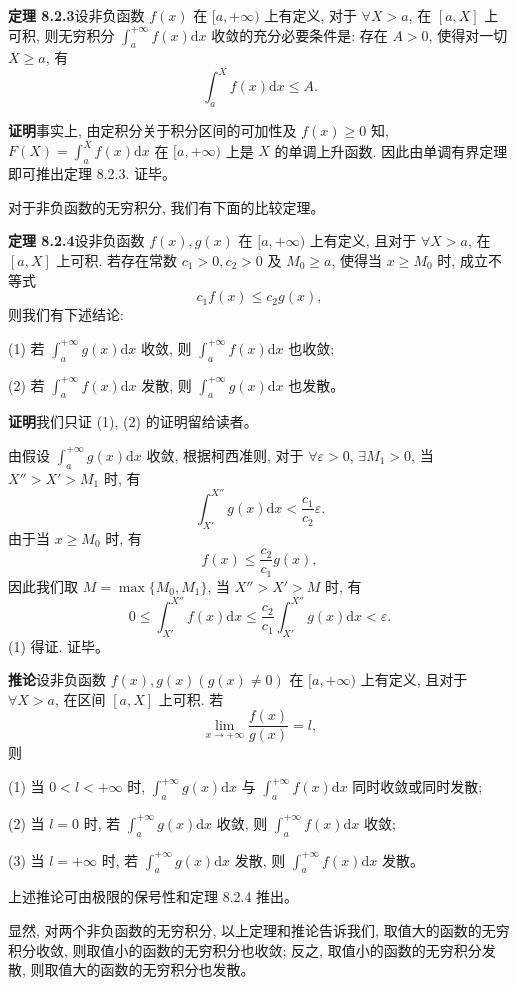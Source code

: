 \documentclass[UTF8, 12pt, fontset=fandol, oneside]{ctexart}
\begin{document}
\noindent\textbf{定理 8.2.3}\quad 设非负函数 $f(x)$ 在 $[a,+\infty)$ 上有定义, 对于 $\forall X>a$, 在 $[a,X]$ 上可积, 则无穷积分 $\int_a^{+\infty}f(x)\mathrm dx$ 收敛的充分必要条件是: 存在 $A>0$, 使得对一切 $X\geq a$, 有
\[
  \int_a^X f(x)\mathrm dx\leq A.
\]

\noindent\textbf{证明}\quad 事实上, 由定积分关于积分区间的可加性及 $f(x)\geq0$ 知, $F(X)=\int_a^X f(x)\mathrm dx$ 在 $[a,+\infty)$ 上是 $X$ 的单调上升函数. 因此由单调有界定理即可推出定理 8.2.3. 证毕。

对于非负函数的无穷积分, 我们有下面的比较定理。

\noindent\textbf{定理 8.2.4}\quad 设非负函数 $f(x),g(x)$ 在 $[a,+\infty)$ 上有定义, 且对于 $\forall X>a$, 在 $[a,X]$ 上可积. 若存在常数 $c_1>0,c_2>0$ 及 $M_0\geq a$, 使得当 $x\geq M_0$ 时, 成立不等式
\[
  c_1f(x)\leq c_2g(x),
\]
则我们有下述结论:

(1) 若 $\int_a^{+\infty}g(x)\mathrm dx$ 收敛, 则 $\int_a^{+\infty}f(x)\mathrm dx$ 也收敛;

(2) 若 $\int_a^{+\infty}f(x)\mathrm dx$ 发散, 则 $\int_a^{+\infty}g(x)\mathrm dx$ 也发散。

\noindent\textbf{证明}\quad 我们只证 (1), (2) 的证明留给读者。

由假设 $\int_a^{+\infty}g(x)\mathrm dx$ 收敛, 根据柯西准则, 对于 $\forall\varepsilon>0$, $\exists M_1>0$, 当 $X''>X'>M_1$ 时, 有
\[
  \int_{X'}^{X''}g(x)\mathrm dx<\frac{c_1}{c_2}\varepsilon.
\]
由于当 $x\geq M_0$ 时, 有
\[
  f(x)\leq \frac{c_2}{c_1}g(x),
\]
因此我们取 $M=\max\{M_0,M_1\}$, 当 $X''>X'>M$ 时, 有
\[
  0\leq \int_{X'}^{X''}f(x)\mathrm dx
  \leq
  \frac{c_2}{c_1}\int_{X'}^{X''}g(x)\mathrm dx<\varepsilon.
\]
(1) 得证. 证毕。

\noindent\textbf{推论}\quad 设非负函数 $f(x),g(x)(g(x)\ne0)$ 在 $[a,+\infty)$ 上有定义, 且对于 $\forall X>a$, 在区间 $[a,X]$ 上可积. 若
\[
  \lim_{x\to+\infty}\frac{f(x)}{g(x)}=l,
\]
则

(1) 当 $0<l<+\infty$ 时, $\int_a^{+\infty}g(x)\mathrm dx$ 与 $\int_a^{+\infty}f(x)\mathrm dx$ 同时收敛或同时发散;

(2) 当 $l=0$ 时, 若 $\int_a^{+\infty}g(x)\mathrm dx$ 收敛, 则 $\int_a^{+\infty}f(x)\mathrm dx$ 收敛;

(3) 当 $l=+\infty$ 时, 若 $\int_a^{+\infty}g(x)\mathrm dx$ 发散, 则 $\int_a^{+\infty}f(x)\mathrm dx$ 发散。

上述推论可由极限的保号性和定理 8.2.4 推出。

显然, 对两个非负函数的无穷积分, 以上定理和推论告诉我们, 取值大的函数的无穷积分收敛, 则取值小的函数的无穷积分也收敛; 反之, 取值小的函数的无穷积分发散, 则取值大的函数的无穷积分也发散。
\end{document}
